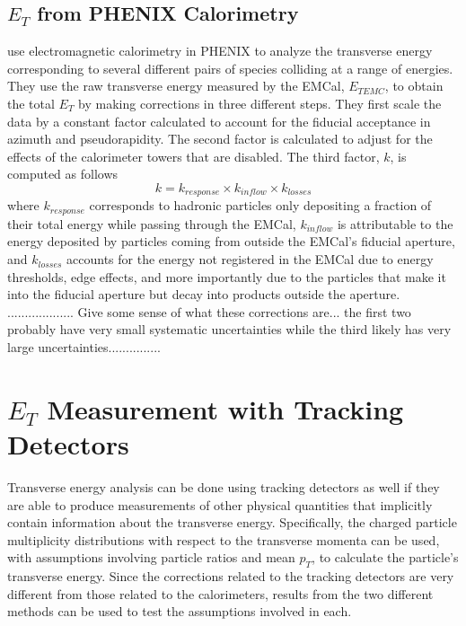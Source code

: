 \subsection{$E_{T}$ from PHENIX Calorimetry}
\citet{PhysRevC.93.024901} use electromagnetic calorimetry in PHENIX to analyze the transverse energy corresponding to several different pairs of species colliding at a range of energies. They use the raw transverse energy measured by the EMCal, $E_{{T}EMC}$, to obtain the total $E_{T}$ by making corrections in three different steps. They first scale the data by a constant factor calculated to account for the fiducial acceptance in azimuth and pseudorapidity. The second factor is calculated to adjust for the effects of the calorimeter towers that are disabled. The third factor, $k$, is computed as follows
\begin{equation}\label{eqn:AdareKfactor}
k = k_{response} \times k_{inflow} \times k_{losses}
\end{equation}
where $k_{response}$ corresponds to hadronic particles only depositing a fraction of their total energy while passing through the EMCal, $k_{inflow}$ is attributable to the energy deposited by particles coming from outside the EMCal's fiducial aperture, and $k_{losses}$ accounts for the energy not registered in the EMCal due to energy thresholds, edge effects, and more importantly due to the particles that make it into the fiducial aperture but decay into products outside the aperture. ................... Give some sense of what these corrections are... the first two probably have very small systematic uncertainties while the third likely has very large uncertainties...............

\section{$E_{T}$ Measurement with Tracking Detectors}
Transverse energy analysis can be done using tracking detectors as well if they are able to produce measurements of other physical quantities that implicitly contain information about the transverse energy. Specifically, the charged particle multiplicity distributions with respect to the transverse momenta can be used, with assumptions involving particle ratios and mean $p_{T}$, to calculate the particle's transverse energy. Since the corrections related to the tracking detectors are very different from those related to the calorimeters, results from the two different methods can be used to test the assumptions involved in each.

